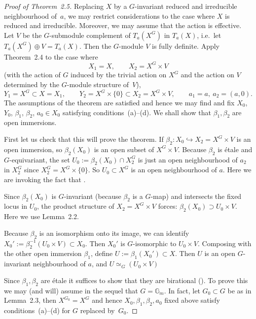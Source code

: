 \documentclass[12pt]{article}
\begin{document}
\begin{proof}
[Proof of Theorem~2.5]
Replacing $X$ by a $G$-invariant reduced and irreducible neighbourhood of~$a$,
we may restrict considerations to the case where $X$ is reduced and irreducible.
Moreover, we may assume that the action is effective.
Let $V$ be the $G$-submodule complement of $T_a(X^G)$ in $T_a(X)$,
i.e.\ let $T_a(X^G)\oplus V = T_a(X)$.
Then the $G$-module $V$ is fully definite.
Apply Theorem~2.4 to the case where
\[
   X_1 = X,\qquad 
   X_2 = X^G\times V
\]
(with the action of $G$ induced by the trivial action on $X^G$
and the action on $V$ determined by the $G$-module structure of~$V$),
\[
   Y_1 = X^G \subset X = X_1, \qquad
   Y_2 = X^G\times\{0\}\subset X_2 = X^G\times V, \qquad
   a_1=a,\ a_2=(a,0).
\]
The assumptions of the theorem are satisfied and hence we may find
and fix $X_0$, $Y_0$, $\beta_1$, $\beta_2$, $a_0\in X_0$
satisfying conditions~(a)–(d).
We shall show that $\beta_1,\beta_2$ are open immersions.

First let us check that this will prove the theorem. If $\beta_2: X_0 \hookrightarrow X_2 = X^G\times V$ is an open immersion, so $\beta_2(X_0)$ is an open subset of $X^G\times V$. Because $\beta_2$ is étale and $G$-equivariant, the set $U_0 := \beta_2(X_0) \cap X_2^G$ is just an open neighbourhood of $a_2$ in $X_2^G$ since $X_2^G = X^G \times \{0\}$. So $U_0 \subset X^G$ is an open neighbourhood of $a$. Here we are invoking the fact that .

Since $\beta_2(X_0)$ is $G$-invariant (because $\beta_2$ is a $G$-map) and intersects the fixed locus in $U_0$, the product structure of $X_2 = X^G\times V$ forces: $\beta_2(X_0) \supset U_0\times V$. Here we use Lemma~2.2.

Because $\beta_2$ is an isomorphism onto its image, we can identify $X_0' := \beta_2^{-1}(U_0\times V) \subset X_0$. Then $X_0'$ is $G$-isomorphic to $U_0\times V$. Composing with the other open immersion $\beta_1$, define $U := \beta_1(X_0') \subset X$. Then $U$ is an open $G$-invariant neighbourhood of $a$, and $U \simeq_G (U_0\times V)$

Since $\beta_1,\beta_2$ are \'etale it suffices to show
that they are birational ().
To prove this we may (and will) assume in the sequel that $G=\mathbb G_m$. In fact, let $G_0\subset G$ be as in Lemma~2.3, then $X^{G_0}=X^G$ and hence $X_0,\beta_1,\beta_2,a_0$ fixed above satisfy conditions~(a)–(d) for $G$ replaced by~$G_0$.


\end{proof}
\end{document}
